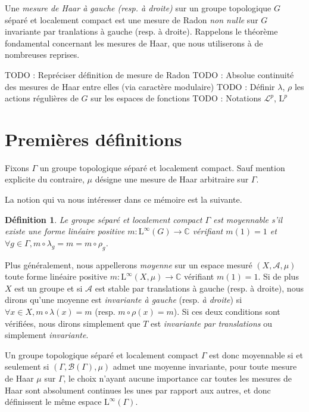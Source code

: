 \documentclass[a4paper,12pt]{article}
\newtheorem{definition}[theorem]{Définition}
\newcommand{\C}{\mathbb{C}}
\newcommand{\Bor}{\mathcal{B}}
\newcommand{\ssi}{si et seulement si }
\newcommand{\comp}{\circ}
\newcommand{\TODO}[1]{{\color{red}TODO :} #1}
\begin{document}
Une \textit{mesure de Haar à gauche (resp. à droite)} sur un groupe topologique $G$ séparé et localement compact est une mesure de
Radon \emph{non nulle} sur $G$ invariante par tranlations à gauche (resp. à droite). Rappelons le théorème fondamental concernant les mesures de Haar, que nous 
utiliserons à de nombreuses reprises.

\TODO{Repréciser définition de mesure de Radon}
\TODO{Absolue continuité des mesures de Haar entre elles (via caractère modulaire)}
\TODO{Définir $\lambda$, $\rho$ les actions régulières de $G$ sur les espaces de fonctions}
\TODO{Notations $\mathscr{L}^p$, $\mathrm{L}^p$}

\section{Premières définitions}

Fixons $\Gamma$ un groupe topologique séparé et localement compact. Sauf mention explicite du contraire, $\mu$ désigne une mesure de Haar arbitraire
sur $\Gamma$.

La notion qui va nous intéresser dans ce mémoire est la suivante.

\begin{definition}\label{amenable_def}
    Le groupe séparé et localement compact $\Gamma$ est \emph{moyennable} s'il existe une forme linéaire positive $m : \mathrm{L}^\infty(G)\to\C$
    vérifiant $m(1) = 1$ et $\forall g\in\Gamma, m\comp\lambda_g = m = m\comp\rho_g$.
\end{definition}

Plus généralement, nous appellerons \emph{moyenne} sur un espace mesuré $(X,\mathcal{A},\mu)$ toute forme 
linéaire positive $m : \mathrm{L}^\infty(X, \mu)\to\C$ vérifiant $m(1) = 1$. Si de plus $X$ est un groupe 
et si $\mathcal{A}$ est stable par translations à gauche (resp. à droite), nous dirons qu'une moyenne est \emph{invariante à gauche}
(resp. \emph{à droite}) si $\forall x\in X, m\comp\lambda(x) = m$ (resp. $m\comp\rho(x) = m$). Si ces deux conditions 
sont vérifiées, nous dirons simplement que $T$ est \emph{invariante par translations} ou simplement \emph{invariante}.

Un groupe topologique séparé et localement compact $\Gamma$ est donc moyennable \ssi $(\Gamma, \Bor(\Gamma), \mu)$ admet une 
moyenne invariante, pour toute mesure de Haar $\mu$ sur $\Gamma$, le choix n'ayant aucune importance car toutes les mesures 
de Haar sont absolument continues les unes par rapport aux autres, et donc définissent le même espace $\mathrm{L}^\infty(\Gamma)$.
\end{document}
